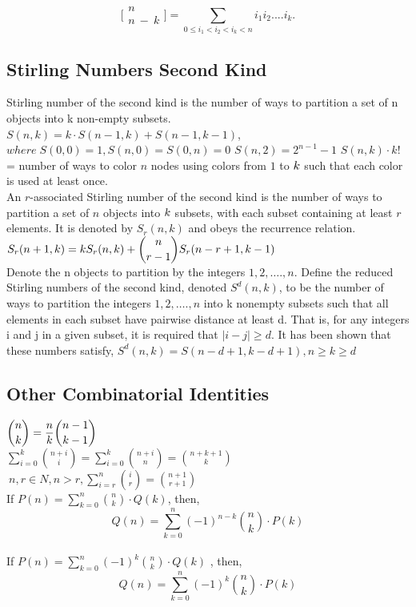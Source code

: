 \begin{multicols*}{3}
\[\displaystyle \bigl[\!\begin{smallmatrix} n \\ n\ -\ k \end{smallmatrix}\!\bigr] = \sum_{0 \leq i_1 < i_2 < i_k < n}{i_1i_2....i_k.}\]

\subsection{Stirling Numbers Second Kind}
Stirling number of the second kind is the number of ways to partition a set of n objects into k non-empty subsets. \\
$S(n,k)=k \cdot S(n-1,k)+S(n-1,k-1)$, \(where \; S(0,0)=1,S(n,0)=S(0,n)=0\)
$S(n,2)=2^{n-1}-1$ 
$S(n,k) \cdot k!$ = number of ways to color $n$ nodes using colors from $\displaystyle 1$ to $\displaystyle \displaystyle k$ such that each color is used at least once. \\
An $r$-associated Stirling number of the second kind is the number of ways to partition a set of $n$ objects into $\displaystyle \displaystyle k$ subsets, with each subset containing at least $r$ elements. It is denoted by $S_r( n , k )$ and obeys the recurrence relation. $\displaystyle \displaystyle S_r(n+1,k) = k S_r(n,k) + \binom{n}{r-1} S_r(n-r+1,k-1)$ \\ 
Denote the n objects to partition by the integers $\displaystyle 1, 2, …., n$. Define the reduced Stirling numbers of the second kind, denoted $S^d(n, k)$, to be the number of ways to partition the integers $\displaystyle 1, 2, …., n$ into k nonempty subsets such that all elements in each subset have pairwise distance at least d. That is, for any integers i and j in a given subset, it is required that $|i - j| \geq d$. It has been shown that these numbers satisfy, \(S^d(n, k) = S(n - d + 1, k - d + 1), n \geq k \geq d\)
\subsection{Other Combinatorial Identities}
$\displaystyle \displaystyle {n \choose k}=\frac{n}{k}{n-1 \choose k-1}$ \\
$\displaystyle \sum \limits_{i= 0}^k{n+i \choose i}= \sum \limits_{i= 0}^k{n+i \choose n} = {n+k+1 \choose k}$ \\
$\displaystyle \ n,r \in N, n > r, \sum \limits_{i=r}^n{i \choose r}={n+1 \choose r+1}$ \\
If $\displaystyle P(n)=\sum_{k=0}^{n}{n \choose k} \cdot Q(k)$, then,
\[Q(n)=\sum_{k=0}^{n}(-1)^{n-k}{n \choose k} \cdot P(k)\] \\
If $\displaystyle P(n)=\sum_{k=0}^{n}(-1)^{k}{n \choose k} \cdot Q(k)$ , then,
\[Q(n)=\sum_{k=0}^{n}(-1)^{k}{n \choose k} \cdot P(k)\]


\end{multicols*}
